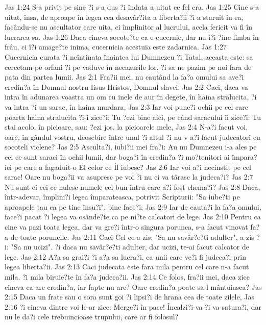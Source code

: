 Jas 1:24  S-a privit pe sine ?i s-a dus ?i îndata a uitat ce fel era.
Jas 1:25  Cine s-a uitat, însa, de aproape în legea cea desavâr?ita a liberta?ii ?i a staruit în ea, facându-se nu ascultator care uita, ci împlinitor al lucrului, acela fericit va fi în lucrarea sa.
Jas 1:26  Daca cineva socote?te ca e cucernic, dar nu î?i ?ine limba în frâu, ci î?i amage?te inima, cucernicia acestuia este zadarnica.
Jas 1:27  Cucernicia curata ?i neîntinata înaintea lui Dumnezeu ?i Tatal, aceasta este: sa cercetam pe orfani ?i pe vaduve în necazurile lor, ?i sa ne pazim pe noi fara de pata din partea lumii.
Jas 2:1  Fra?ii mei, nu cautând la fa?a omului sa ave?i credin?a în Domnul nostru Iisus Hristos, Domnul slavei.
Jas 2:2  Caci, daca va intra în adunarea voastra un om cu inele de aur în degete, în haina stralucita, ?i va intra ?i un sarac, în haina murdara,
Jas 2:3  Iar voi pune?i ochii pe cel care poarta haina stralucita ?i-i zice?i: Tu ?ezi bine aici, pe când saracului îi zice?i: Tu stai acolo, în picioare, sau: ?ezi jos, la picioarele mele,
Jas 2:4  N-a?i facut voi, oare, în gândul vostru, deosebire între unul ?i altul ?i nu v-a?i facut judecatori cu socoteli viclene?
Jas 2:5  Asculta?i, iubi?ii mei fra?i: Au nu Dumnezeu i-a ales pe cei ce sunt saraci în ochii lumii, dar boga?i în credin?a ?i mo?tenitori ai împara?iei pe care a fagaduit-o El celor ce Îl iubesc?
Jas 2:6  Iar voi a?i necinstit pe cel sarac! Oare nu boga?ii va asupresc pe voi ?i nu ei va târasc la judeca?i?
Jas 2:7  Nu sunt ei cei ce hulesc numele cel bun întru care a?i fost chema?i?
Jas 2:8  Daca, într-adevar, împlini?i legea împarateasca, potrivit Scripturii: "Sa iube?ti pe aproapele tau ca pe tine însu?i", bine face?i;
Jas 2:9  Iar de cauta?i la fa?a omului, face?i pacat ?i legea va osânde?te ca pe ni?te calcatori de lege.
Jas 2:10  Pentru ca cine va pazi toata legea, dar va gre?i într-o singura porunca, s-a facut vinovat fa?a de toate poruncile.
Jas 2:11  Caci Cel ce a zis: "Sa nu savâr?e?ti adulter", a zis ?i: "Sa nu ucizi". ?i daca nu savâr?e?ti adulter, dar ucizi, te-ai facut calcator de lege.
Jas 2:12  A?a sa grai?i ?i a?a sa lucra?i, ca unii care ve?i fi judeca?i prin legea liberta?ii.
Jas 2:13  Caci judecata este fara mila pentru cel care n-a facut mila. ?i mila biruie?te în fa?a judeca?ii.
Jas 2:14  Ce folos, fra?ii mei, daca zice cineva ca are credin?a, iar fapte nu are? Oare credin?a poate sa-l mântuiasca?
Jas 2:15  Daca un frate sau o sora sunt goi ?i lipsi?i de hrana cea de toate zilele,
Jas 2:16  ?i cineva dintre voi le-ar zice: Merge?i în pace! Încalzi?i-va ?i va satura?i, dar nu le da?i cele trebuincioase trupului, care ar fi folosul?

